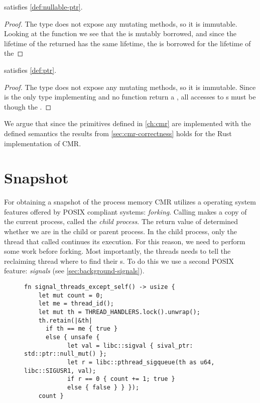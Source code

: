 \begin{claim}
   satisfies \cref{def:nullable-ptr}.
\end{claim}
\begin{proof}
  The type does not expose any mutating methods, so it is immutable.
  Looking at the function  we see that the  is mutably borrowed, and
  since the lifetime of the  returned has the same lifetime, the  is
  borrowed for the lifetime of the 
\end{proof}

\begin{claim}
   satisfies \cref{def:ptr}.
\end{claim}
\begin{proof}
  The type does not expose any mutating methods, so it is immutable.
  Since  is the only type implementing  and no function return a ,
  all accesses to s must be though the .
\end{proof}


We argue that since the primitives defined in \cref{ch:cmr} are implemented with the defined
semantics the results from \cref{sec:cmr-correctness} holds for the Rust implementation of CMR.


\section{Snapshot\label{sec:impl-snapshot}}

For obtaining a snapshot of the process memory CMR utilizes a operating system features offered
by POSIX compliant systems: \emph{forking}.
Calling  makes a copy of the current process, called the \emph{child process}.
The return value of  determined whether we are in the child or parent process.
In the child process, only the thread that called  continues its execution. For this
reason, we need to perform some work before forking. Most importantly, the threads needs to tell
the reclaiming thread where to find their s. To do this we use a second POSIX feature:
\emph{signals} (see \cref{sec:background-signals}).

\begin{figure}[ht]
  \begin{lstlisting}[style=Rust,label=lst:thread-signaling,
  caption=Thread signaling,
  ]
fn signal_threads_except_self() -> usize {
    let mut count = 0;
    let me = thread_id();
    let mut th = THREAD_HANDLERS.lock().unwrap();
    th.retain(|&th|
      if th == me { true }
      else { unsafe {
            let val = libc::sigval { sival_ptr: std::ptr::null_mut() };
            let r = libc::pthread_sigqueue(th as u64, libc::SIGUSR1, val);
            if r == 0 { count += 1; true }
            else { false } } });
    count }
\end{lstlisting}
\end{figure}

